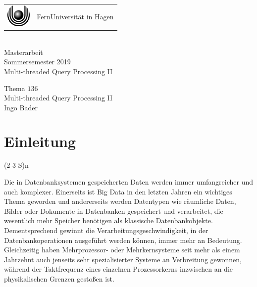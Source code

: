\documentclass[a4paper,12pt,twoside]{article}
\newcommand{\No}{$136$}
\newcommand{\Theme}{Multi-threaded Query Processing II}
\newcommand{\Name}{Ingo Bader}
\begin{document}
\thispagestyle{empty}
\pagestyle{empty}

\begin{center}
\begin{huge}
\vspace*{3cm}
    \begin{tabular}{m{1.2cm}@{\ \ }m{9cm}}
      \includegraphics[width=1.2cm]{logo.eps} & {FernUniversität in Hagen}
    \end{tabular}
    \\
    \vspace*{3cm}
   Masterarbeit \\
   Sommersemester 2019 \\[2em]
   \glqq{}Multi-threaded Query Processing II\grqq{} \\[2cm]
\end{huge}
\begin{large}
   Thema \No\\[1em]
   \Theme\\[3cm]
   \Name
\end{large}
\end{center}

\clearpage
\tableofcontents
\clearpage
\raggedbottom
\thispagestyle{fancy}
\pagestyle{fancy}
\setcounter{page}{1}

\section{Einleitung} (2-3 S)n

Die in Datenbanksystemen gespeicherten Daten werden immer umfangreicher und auch komplexer. Einerseits ist Big Data in den letzten Jahren ein wichtiges Thema geworden und andererseits werden Datentypen wie räumliche Daten, Bilder oder Dokumente in Datenbanken gespeichert und verarbeitet, die wesentlich mehr Speicher benötigen als klassische Datenbankobjekte. Dementsprechend gewinnt die Verarbeitungsgeschwindigkeit, in der Datenbankoperationen ausgeführt werden können, immer mehr an Bedeutung. Gleichzeitig haben Mehrprozessor- oder Mehrkernsysteme seit mehr als einem Jahrzehnt auch jenseits sehr spezialisierter Systeme an Verbreitung gewonnen, während der Taktfrequenz eines einzelnen Prozessorkerns inzwischen an die physikalischen Grenzen gestoßen ist.
\end{document}
